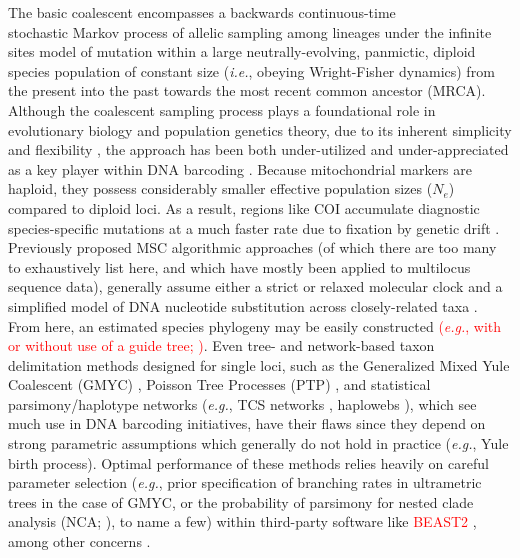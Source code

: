 \documentclass[12pt]{article}
\begin{document}
The basic coalescent \citep{kingman1982coalescent, kingman1982genealogy} encompasses a backwards continuous-time \\ stochastic Markov process of allelic sampling among lineages under the infinite sites model of mutation within a large neutrally-evolving, panmictic, diploid species population of constant size (\textit{i.e.}, obeying Wright-Fisher dynamics) from the present into the past towards the most recent common ancestor (MRCA). Although the coalescent sampling process plays a foundational role in evolutionary biology and population genetics theory, due to its inherent simplicity and flexibility \citep{rosenberg2002genealogical, degnan2009gene}, the approach has been both under-utilized and under-appreciated as a key player within DNA barcoding \citep{collins2014known, dowton2014preliminary, hubert2015dna, phillips2022lack}. Because mitochondrial markers are haploid, they possess considerably smaller effective population sizes ($N_e$) compared to diploid loci. As a result, regions like COI accumulate diagnostic species-specific mutations at a much faster rate due to fixation by genetic drift \citep{hubert2015dna, phillips2022lack}.  Previously proposed MSC algorithmic approaches (of which there are too many to exhaustively list here, and which have mostly been applied to multilocus sequence data), generally assume either a strict or relaxed molecular clock and a simplified model of DNA nucleotide substitution across closely-related taxa \citep{ho2014molecular, flouri2022bayesian}. From here, an estimated species phylogeny may be easily constructed \textcolor{red}{(\textit{e.g.}, with or without use of a guide tree; \citet{rannala2003bayes, rannala2017efficient, yang2010bayesian, yang2014unguided, yang2017bayesian})}. Even tree- and network-based taxon delimitation methods designed for single loci, such as the Generalized Mixed Yule Coalescent (GMYC) \citep{pons2006sequence, monaghan2009accelerated, fujisawa2013delimiting}, Poisson Tree Processes (PTP) \citep{zhang2013general, kapli2017multirate}, and statistical parsimony/haplotype networks (\textit{e.g.}, TCS networks \citep{templeton1992cladistic}, haplowebs \citep{dellicour2015delimiting, dellicour2018hitchhiker}), which see much use in DNA barcoding initiatives, have their flaws since they depend on strong parametric assumptions which generally do not hold in practice (\textit{e.g.}, Yule birth process). Optimal performance of these methods relies heavily on careful parameter selection (\textit{e.g.}, prior  specification of branching rates in ultrametric trees in the case of GMYC, or the probability of parsimony for nested clade analysis (NCA; \citet{templeton1998nested}), to name a few) \citep{hubert2024delimiting} within third-party software like \textcolor{red}{BEAST2} \citep{bouckaert2019beast}, among other concerns \citep{talavera2013factors, tang2014effects, fonseca2021gmyc}. 
\end{document}
